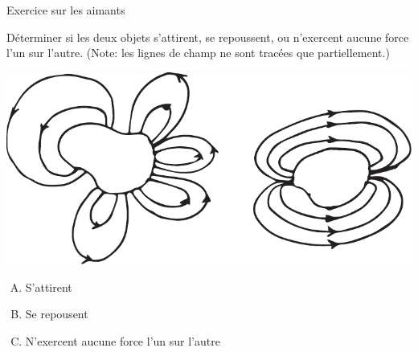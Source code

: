 \documentclass{beamer}
\begin{document}
\begin{frame}[t]{Exercice sur les aimants}

  Déterminer si les deux objets s'attirent, se repoussent, ou n'exercent aucune
  force l'un sur l'autre. (Note: les lignes de champ ne sont tracées que
  partiellement.)

  \begin{center}
    \includegraphics[scale=0.6]{figures/exercice-champ-magnetique1b.pdf}
  \end{center}

  \begin{enumerate}[A.]
    \item S'attirent
    \item Se repousent
    \item N'exercent aucune force l'un sur l'autre
  \end{enumerate}

\end{frame}
\end{document}
